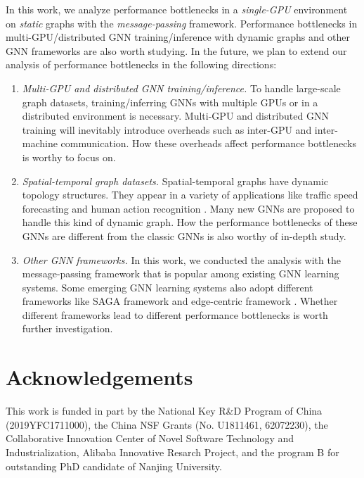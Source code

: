 In this work, we analyze performance bottlenecks in a \emph{single-GPU} environment on \emph{static} graphs with the \emph{message-passing} framework.
%
Performance bottlenecks in multi-GPU/distributed GNN training/inference with dynamic graphs and other GNN frameworks are also worth studying.
%
In the future, we plan to extend our analysis of performance bottlenecks in the following directions:
%
\begin{enumerate}
    \item \emph{Multi-GPU and distributed GNN training/inference.}
    To handle large-scale graph datasets, training/inferring GNNs with multiple GPUs or in a distributed environment is necessary.
    Multi-GPU and distributed GNN training will inevitably introduce overheads such as inter-GPU and inter-machine communication. 
    How these overheads affect performance bottlenecks is worthy to focus on.
    \item \emph{Spatial-temporal graph datasets.}
    Spatial-temporal graphs have dynamic topology structures.
    They appear in a variety of applications like traffic speed forecasting \cite{li2018_DCRNN} and human action recognition \cite{yan2018_STGCN}.
    Many new GNNs are proposed to handle this kind of dynamic graph.
    How the performance bottlenecks of these GNNs are different from the classic GNNs is also worthy of in-depth study.
    \item \emph{Other GNN frameworks.}
    In this work, we conducted the analysis with the message-passing framework that is popular among existing GNN learning systems.
    Some emerging GNN learning systems also adopt different frameworks like SAGA framework \cite{ma2019_neugraph} and edge-centric framework \cite{he2019_EnGN}.
    Whether different frameworks lead to different performance bottlenecks is worth further investigation.
\end{enumerate}

\section*{Acknowledgements}

This work is funded in part by the National Key R\&D Program of China (2019YFC1711000), the China NSF Grants (No. U1811461, 62072230), the Collaborative Innovation Center of Novel Software Technology and Industrialization, Alibaba Innovative Resarch Project, and the program B for outstanding PhD candidate of Nanjing University.

